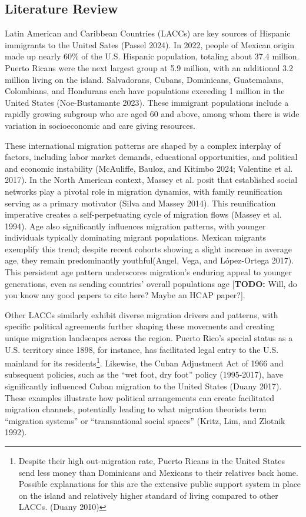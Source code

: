 \documentclass[
]{article}
\begin{document}
\subsection{Literature Review}\label{sec-lit}

Latin American and Caribbean Countries (LACCs) are key sources of
Hispanic immigrants to the United Sates (Passel 2024). In 2022, people
of Mexican origin made up nearly 60\% of the U.S. Hispanic population,
totaling about 37.4 million. Puerto Ricans were the next largest group
at 5.9 million, with an additional 3.2 million living on the island.
Salvadorans, Cubans, Dominicans, Guatemalans, Colombians, and Hondurans
each have populations exceeding 1 million in the United States
(Noe-Bustamante 2023). These immigrant populations include a rapidly
growing subgroup who are aged 60 and above, among whom there is wide
variation in socioeconomic and care giving resources.

These international migration patterns are shaped by a complex interplay
of factors, including labor market demands, educational opportunities,
and political and economic instability (McAuliffe, Bauloz, and Kitimbo
2024; Valentine et al. 2017). In the North American context, Massey et
al. posit that established social networks play a pivotal role in
migration dynamics, with family reunification serving as a primary
motivator (Silva and Massey 2014). This reunification imperative creates
a self-perpetuating cycle of migration flows (Massey et al. 1994). Age
also significantly influences migration patterns, with younger
individuals typically dominating migrant populations. Mexican migrants
exemplify this trend; despite recent cohorts showing a slight increase
in average age, they remain predominantly youthful(Angel, Vega, and
López-Ortega 2017). This persistent age pattern underscores migration's
enduring appeal to younger generations, even as sending countries'
overall populations age {[}\textbf{TODO:} Will, do you know any good
papers to cite here? Maybe an HCAP paper?{]}.

Other LACCs similarly exhibit diverse migration drivers and patterns,
with specific political agreements further shaping these movements and
creating unique migration landscapes across the region. Puerto Rico's
special status as a U.S. territory since 1898, for instance, has
facilitated legal entry to the U.S. mainland for its
residents\footnote{Despite their high out-migration rate, Puerto Ricans
  in the United States send less money than Dominicans and Mexicans to
  their relatives back home. Possible explanations for this are the
  extensive public support system in place on the island and relatively
  higher standard of living compared to other LACCs. (Duany 2010)}.
Likewise, the Cuban Adjustment Act of 1966 and subsequent policies, such
as the ``wet foot, dry foot'' policy (1995-2017), have significantly
influenced Cuban migration to the United States (Duany 2017). These
examples illustrate how political arrangements can create facilitated
migration channels, potentially leading to what migration theorists term
``migration systems'' or ``transnational social spaces'' (Kritz, Lim,
and Zlotnik 1992).
\end{document}
